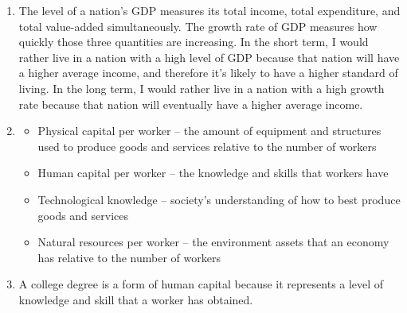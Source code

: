 \documentclass{article}
\begin{document}
\begin{enumerate}

\item The level of a nation's GDP measures its total income, total expenditure, and total value-added simultaneously. The growth rate of GDP measures how quickly those three quantities are increasing. In the short term, I would rather live in a nation with a high level of GDP because that nation will have a higher average income, and therefore it's likely to have a higher standard of living. In the long term, I would rather live in a nation with a high growth rate because that nation will eventually have a higher average income.

\item \phantom{x}

	\begin{itemize}
	
	\item Physical capital per worker -- the amount of equipment and structures used to produce goods and services relative to the number of workers
	
	\item Human capital per worker -- the knowledge and skills that workers have
	
	\item Technological knowledge -- society's understanding of how to best produce goods and services
	
	\item Natural resources per worker -- the environment assets that an economy has relative to the number of workers
	
	\end{itemize}

\item A college degree is a form of human capital because it represents a level of knowledge and skill that a worker has obtained. 

\end{enumerate}
\end{document}
